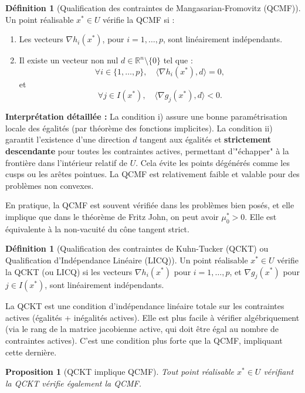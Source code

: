 \documentclass[a4paper,12pt,openany]{book}
\theoremstyle{plain}
\newtheorem{proposition}[theorem]{Proposition}
\theoremstyle{definition}
\newtheorem{definition}[theorem]{Définition}
\theoremstyle{remark}
\theoremstyle{nbstyle}
\begin{document}
	\begin{definition}[Qualification des contraintes de Mangasarian-Fromovitz (QCMF)]\label{Def4.2.2}
		Un point réalisable \( x^* \in U \) vérifie la QCMF si :
		\begin{enumerate}
			\item[i)] Les vecteurs \( \nabla h_i(x^*) \), pour \( i = 1, \dots, p \), sont linéairement indépendants.
			\item[ii)] Il existe un vecteur non nul \( d \in \mathbb{R}^n \setminus \{0\} \) tel que :
			\[
			\forall i \in \{1, \dots, p\}, \quad \langle \nabla h_i(x^*), d \rangle = 0,
			\]
			et
			\[
			\forall j \in I(x^*), \quad \langle \nabla g_j(x^*), d \rangle < 0.
			\]
		\end{enumerate}
	\end{definition}
	
	\textbf{Interprétation détaillée :} La condition i) assure une bonne paramétrisation locale des égalités (par théorème des fonctions implicites). La condition ii) garantit l'existence d'une direction \( d \) tangent aux égalités et \textbf{strictement descendante} pour toutes les contraintes actives, permettant d'"échapper" à la frontière dans l'intérieur relatif de \( U \). Cela évite les points dégénérés comme les cusps ou les arêtes pointues. La QCMF est relativement faible et valable pour des problèmes non convexes.
	
	En pratique, la QCMF est souvent vérifiée dans les problèmes bien posés, et elle implique que dans le théorème de Fritz John, on peut avoir \( \mu_0^* > 0 \). Elle est équivalente à la non-vacuité du cône tangent strict.
	
	\begin{definition}[Qualification des contraintes de Kuhn-Tucker (QCKT) ou Qualification d'Indépendance Linéaire (LICQ)]
		Un point réalisable \( x^* \in U \) vérifie la QCKT (ou LICQ) si les vecteurs \( \nabla h_i(x^*) \) pour \( i = 1, \dots, p \), et \( \nabla g_j(x^*) \) pour \( j \in I(x^*) \), sont linéairement indépendants.
	\end{definition}
	
	La QCKT est une condition d'indépendance linéaire totale sur les contraintes actives (égalités + inégalités actives). Elle est plus facile à vérifier algébriquement (via le rang de la matrice jacobienne active, qui doit être égal au nombre de contraintes actives). C'est une condition plus forte que la QCMF, impliquant cette dernière.
	
	\begin{proposition}[QCKT implique QCMF]
		Tout point réalisable \( x^* \in U \) vérifiant la QCKT vérifie également la QCMF.
	\end{proposition}
	
\end{document}
